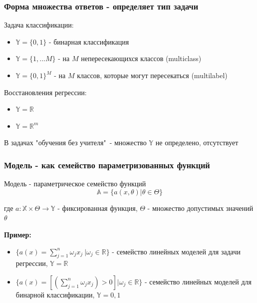 \documentclass{beamer}
\begin{document}
	
	\begin{frame}
		\frametitle{Форма множества ответов - определяет тип задачи}
		
		Задача классификации:
		\begin{itemize}
			\item $\mathbb{Y} = \{0, 1\}$ - бинарная классификация
			\item $\mathbb{Y} = \{1, ... M\}$ - на $M$ непересекающихся классов (multiclass)
			\item $\mathbb{Y} = \{0, 1\}^{M}$ - на $M$ классов, которые могут пересекаться (multilabel)
		\end{itemize}
		
		\vspace{5}
		
		Восстановления регрессии:
		\begin{itemize}
			\item $\mathbb{Y} = \mathbb{R}$ 
			\item $\mathbb{Y} = \mathbb{R}^{m}$
		\end{itemize}
	
		\vspace{5}
		
		В задачах "обучения без учителя"\ - множество $\mathbb{Y}$ не определено, отсутствует
	\end{frame}


	\begin{frame}
		\frametitle{Модель - как семейство параметризованных функций}
		
		Модель - параметрическое семейство функций
		$$
		\mathbb{A} = \{a(x, \theta) | \theta \in \Theta\}
		$$
		
		где $a: \mathbb{X} \times \Theta \to \mathbb{Y}$ - фиксированная функция,
		$\Theta$ - множество допустимых значений $\theta$
		
		\vspace{15}
		
		\textbf{Пример:}
		
		\begin{itemize}
			\item $\{a(x) = \sum_{j=1}^{n} \omega_j x_j\ | \omega_j \in \mathbb{R}\}$ - семейство линейных моделей для задачи регрессии, $\mathbb{Y} = \mathbb{R}$
			
			\item $\{a(x) = [(\sum_{j=1}^{n} \omega_j x_j) > 0] | \omega_j \in \mathbb{R}\}$ - семейство линейных моделей для бинарной классификации, $\mathbb{Y} = {0, 1}$
		\end{itemize}
	\end{frame}
\end{document}
